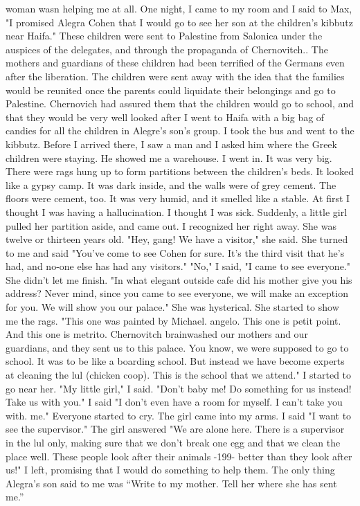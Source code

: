 woman wasn helping me at all. 
One night, I came to my room and I said to Max, "I promised Alegra 
Cohen that I would go to see her son at the children's kibbutz near 
Haifa." These children were sent to Palestine from Salonica under 
the auspices of the delegates, and through the propaganda of Chernovitch.. 
The mothers and guardians of these children had been terrified of the 
Germans even after the liberation. The children were sent away with the 
idea that the families would be reunited once the parents could liquidate their belongings and go to Palestine. Chernovich had assured them 
that the children would go to school, and that they would be very well 
looked after 
I went to Haifa with a big bag of candies for all the children 
in Alegre's son's group. I took the bus and went to the kibbutz. 
Before I arrived there, I saw a man and I asked him where the Greek 
children were staying. He showed me a warehouse. I went in. It was 
very big. There were rags hung up to form partitions between the children's beds. It looked like a gypsy camp. It was dark inside, and the 
walls were of grey cement. The floors were cement, too. It was very 
humid, and it smelled like a stable. At first I thought I was having a 
hallucination. I thought I was sick. Suddenly, a little girl pulled 
her partition aside, and came out. I recognized her right away. She was 
twelve or thirteen years old. 
"Hey, gang! We have a visitor," she said. She turned to me and 
said "You've come to see Cohen for sure. It's the third visit that he's
had, and no-one else has had any visitors." 
"No," I said, "I came to see everyone." She didn't let me finish. 
"In what elegant outside cafe did his mother give you his address? 
Never mind, since you came to see everyone, we will make an exception 
for you. We will show you our palace." She was hysterical. 
She started to show me the rags. "This one was painted by Michael. 
angelo. This one is petit point. And this one is metrito. Chernovitch  
brainwashed our mothers and our guardians, and they sent us to this palace. You know, we were supposed to go to school. It was to be like a
boarding school. But instead we have become experts at cleaning the lul 
(chicken coop). This is the school that we attend." 
I started to go near her. "My little girl," I said. 
"Don't baby me! Do something for us instead! Take us with you." 
I said "I don't even have a room for myself. I can't take you with. 
me." Everyone started to cry. The girl came into my arms. I said "I 
want to see the supervisor." The girl answered "We are alone here. There is a supervisor in the lul only, making sure that we don't break one egg 
and that we clean the place well. These people look after their animals 
-199- 
better than they look after us!" 
I left, promising that I would do something to help them. The only 
thing Alegra's son said to me was “Write to my mother. Tell her where 
she has sent me.” 
